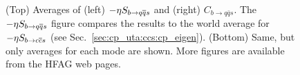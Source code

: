\begin{figure}[htb]
\begin{center}
{    }
    \hfill
  \end{center}
  \vspace{-0.8cm}
  \caption{
    (Top)
    Averages of 
    (left) $-\etacp S_{b \to q\bar q s}$ and (right) $C_{b \to q\bar q s}$.
    The $-\etacp S_{b \to q\bar q s}$ figure compares the results to 
    the world average 
    for $-\etacp S_{b \to c\bar c s}$ (see Sec.~\ref{sec:cp_uta:ccs:cp_eigen}).
    (Bottom) Same, but only averages for each mode are shown.
    More figures are available from the HFAG web pages.
  }
  \label{fig:cp_uta:qqs}
\end{figure}

